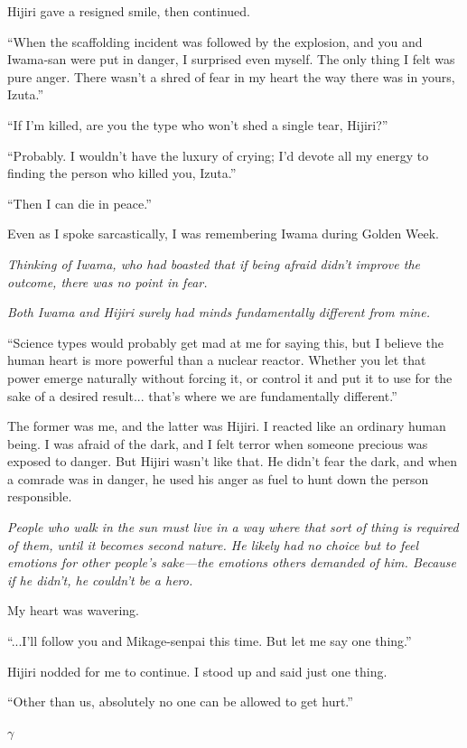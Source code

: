 \documentclass[
    a4paper,
    12pt,
    twoside,
    openany,
    UTF8,
    fontset=windows
]{ctexbook}
\begin{document}
Hijiri gave a resigned smile, then continued.

``When the scaffolding incident was followed by the explosion, and you and Iwama-san were put in danger, I surprised even myself. The only thing I felt was pure anger. There wasn't a shred of fear in my heart the way there was in yours, Izuta.''

``If I'm killed, are you the type who won't shed a single tear, Hijiri?''

``Probably. I wouldn't have the luxury of crying; I'd devote all my energy to finding the person who killed you, Izuta.''

``Then I can die in peace.''

Even as I spoke sarcastically, I was remembering Iwama during Golden Week.

\textit{Thinking of Iwama, who had boasted that if being afraid didn't improve the outcome, there was no point in fear.}

\textit{Both Iwama and Hijiri surely had minds fundamentally different from mine.}

``Science types would probably get mad at me for saying this, but I believe the human heart is more powerful than a nuclear reactor. Whether you let that power emerge naturally without forcing it, or control it and put it to use for the sake of a desired result... that's where we are fundamentally different.''

The former was me, and the latter was Hijiri. I reacted like an ordinary human being. I was afraid of the dark, and I felt terror when someone precious was exposed to danger. But Hijiri wasn't like that. He didn't fear the dark, and when a comrade was in danger, he used his anger as fuel to hunt down the person responsible.

\textit{People who walk in the sun must live in a way where that sort of thing is required of them, until it becomes second nature. He likely had no choice but to feel emotions for other people's sake---the emotions others demanded of him. Because if he didn't, he couldn't be a hero.}

My heart was wavering.

``...I'll follow you and Mikage-senpai this time. But let me say one thing.''

Hijiri nodded for me to continue. I stood up and said just one thing.

``Other than us, absolutely no one can be allowed to get hurt.''

$\gamma$
\end{document}
